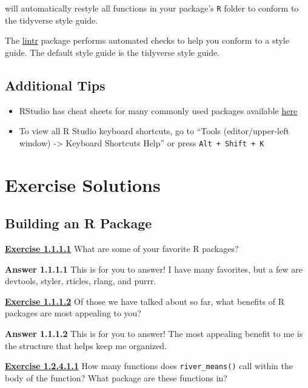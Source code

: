 \documentclass[
]{book}
\providecommand{\tightlist}{%
  \setlength{\itemsep}{0pt}\setlength{\parskip}{0pt}}
\begin{document}
will automatically restyle all functions in your package's \texttt{R} folder to conform to the tidyverse style guide.

The \href{https://github.com/jimhester/lintr}{lintr} package performs automated checks to help you conform to a style guide. The default style guide is the tidyverse style guide.

\hypertarget{add-tips}{%
\section{Additional Tips}\label{add-tips}}

\begin{itemize}
\tightlist
\item
  RStudio has cheat sheets for many commonly used packages available \href{https://www.rstudio.com/resources/cheatsheets/}{here}
\item
  To view all R Studio keyboard shortcuts, go to ``Tools (editor/upper-left window) -\textgreater{} Keyboard Shortcuts Help'' or press \texttt{Alt\ +\ Shift\ +\ K}
\end{itemize}

\hypertarget{exercise-solutions}{%
\chapter{Exercise Solutions}\label{exercise-solutions}}

\hypertarget{building-an-r-package}{%
\section*{Building an R Package}\label{building-an-r-package}}

\textbf{\protect\hyperlink{ex-set1}{Exercise 1.1.1.1}} What are some of your favorite R packages?

\textbf{Answer 1.1.1.1} This is for you to answer! I have many favorites, but a few are devtools, styler, rticles, rlang, and purrr.

\textbf{\protect\hyperlink{ex-set1}{Exercise 1.1.1.2}} Of those we have talked about so far, what benefits of R packages are most appealing to you?

\textbf{Answer 1.1.1.2} This is for you to answer! The most appealing benefit to me is the structure that helps keep me organized.

\textbf{\protect\hyperlink{ex-set2}{Exercise 1.2.4.1.1}} How many functions does \texttt{river\_means()} call within the body of the function? What package are these functions in?
\end{document}
